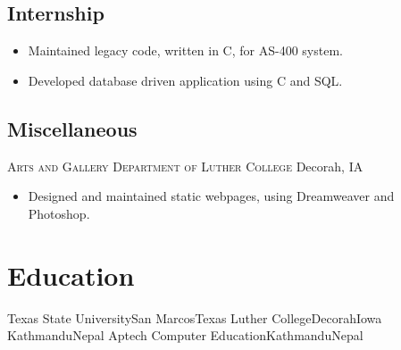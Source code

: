 \documentclass[11pt,letterpaper,sans]{moderncv}
\begin{document}
  \subsection{Internship}
     {\begin{itemize}
         \item Maintained legacy code, written in C, for AS-400 system.
         \item Developed database driven application using C and SQL.
     \end{itemize}}
  
  \subsection{Miscellaneous}
     {\textsc{Arts and Gallery Department of Luther College}}
     {Decorah, IA}{}
     {\begin{itemize}
         \item Designed and maintained static webpages, using Dreamweaver
               and Photoshop.
     \end{itemize}}



\section{Education}
           {Texas State University}{San Marcos}{Texas}{}
           {Luther College}{Decorah}{Iowa}{}
           {Kathmandu}{Nepal}{}
           {Aptech Computer Education}{Kathmandu}{Nepal}{}


\end{document}
